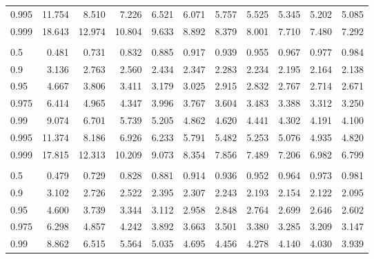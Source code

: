 \documentclass[
]{article}
\begin{document}
\begin{table}[H]
\begin{tabular}{lrrrrrrrrrr}
\hspace{1em}0.995 & 11.754 & 8.510 & 7.226 & 6.521 & 6.071 & 5.757 & 5.525 & 5.345 & 5.202 & 5.085\\
\hspace{1em}0.999 & 18.643 & 12.974 & 10.804 & 9.633 & 8.892 & 8.379 & 8.001 & 7.710 & 7.480 & 7.292\\
\addlinespace[0.3em]
\multicolumn{11}{l}{\textbf{$k_2=13$}}\\
\hspace{1em}0.5 & 0.481 & 0.731 & 0.832 & 0.885 & 0.917 & 0.939 & 0.955 & 0.967 & 0.977 & 0.984\\
\hspace{1em}0.9 & 3.136 & 2.763 & 2.560 & 2.434 & 2.347 & 2.283 & 2.234 & 2.195 & 2.164 & 2.138\\
\hspace{1em}0.95 & 4.667 & 3.806 & 3.411 & 3.179 & 3.025 & 2.915 & 2.832 & 2.767 & 2.714 & 2.671\\
\hspace{1em}0.975 & 6.414 & 4.965 & 4.347 & 3.996 & 3.767 & 3.604 & 3.483 & 3.388 & 3.312 & 3.250\\
\hspace{1em}0.99 & 9.074 & 6.701 & 5.739 & 5.205 & 4.862 & 4.620 & 4.441 & 4.302 & 4.191 & 4.100\\
\hspace{1em}0.995 & 11.374 & 8.186 & 6.926 & 6.233 & 5.791 & 5.482 & 5.253 & 5.076 & 4.935 & 4.820\\
\hspace{1em}0.999 & 17.815 & 12.313 & 10.209 & 9.073 & 8.354 & 7.856 & 7.489 & 7.206 & 6.982 & 6.799\\
\addlinespace[0.3em]
\multicolumn{11}{l}{\textbf{$k_2=14$}}\\
\hspace{1em}0.5 & 0.479 & 0.729 & 0.828 & 0.881 & 0.914 & 0.936 & 0.952 & 0.964 & 0.973 & 0.981\\
\hspace{1em}0.9 & 3.102 & 2.726 & 2.522 & 2.395 & 2.307 & 2.243 & 2.193 & 2.154 & 2.122 & 2.095\\
\hspace{1em}0.95 & 4.600 & 3.739 & 3.344 & 3.112 & 2.958 & 2.848 & 2.764 & 2.699 & 2.646 & 2.602\\
\hspace{1em}0.975 & 6.298 & 4.857 & 4.242 & 3.892 & 3.663 & 3.501 & 3.380 & 3.285 & 3.209 & 3.147\\
\hspace{1em}0.99 & 8.862 & 6.515 & 5.564 & 5.035 & 4.695 & 4.456 & 4.278 & 4.140 & 4.030 & 3.939\\

\end{tabular}
\end{table}
\end{document}
